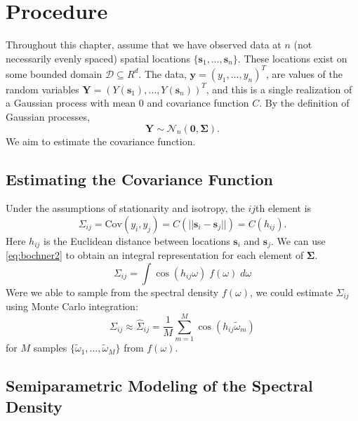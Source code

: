 \chapter{Procedure} \label{chapter2:Procedure}

Throughout this chapter, assume that we have observed data at $n$ (not necessarily evenly spaced) spatial locations $\{\bm{s}_1, \dots, \bm{s}_n\}$. These locations exist on some bounded domain $\mathcal{D} \subseteq{R}^d$. The data, $\bm{y} =(y_1, \dots, y_n)^T$, are values of the random variables $\bm{Y} = (Y(\bm{s}_1), \dots, Y(\bm{s}_n))^T$, and this is a single realization of a Gaussian process with mean 0 and covariance function $C$. By the definition of Gaussian processes,
\[
	\bm{Y} \sim \mathcal{N}_n(\bm{0}, \bm{\Sigma}).
\]
We aim to estimate the covariance function.

\section{Estimating the Covariance Function} %
\label{sec:estimating_the_covariance_function}

Under the assumptions of stationarity and isotropy, the $ij$th element is
\[
	\Sigma_{ij} = \textrm{Cov}(y_i, y_j) = C(||\bm{s}_i - \bm{s}_j||) = C(h_{ij}).
\]
Here $h_{ij}$ is the Euclidean distance between locations $\bm{s}_i$ and $\bm{s}_j$. We can use \eqref{eq:bochner2} to obtain an integral representation for each element of $\bm{\Sigma}$.
\begin{equation}
	\Sigma_{ij} = \int \cos(h_{ij}\omega) \; f(\omega) \; d\omega
\end{equation}
Were we able to sample from the spectral density $f(\omega)$, we could estimate $\Sigma_{ij}$ using Monte Carlo integration:
\begin{equation}
	\Sigma_{ij} \approx \widehat{\Sigma}_{ij} = \frac{1}{M} \sum_{m=1}^M \cos(h_{ij}\widetilde{\omega}_m)
\end{equation}
for $M$ samples $\{\widetilde{\omega}_1, \dots, \widetilde{\omega}_M\}$ from $f(\omega)$.


\section{Semiparametric Modeling of the Spectral \\ Density} %
\label{sec:semiparametric_modeling_of_the_spectral_density}

